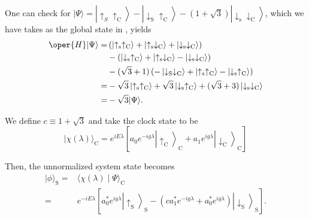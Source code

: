 One can check for $|\Psi\rangle=\left|\uparrow_S \uparrow_{\mathrm{C}}\right\rangle
-\left|\downarrow_{\mathrm{S}} \uparrow_{\mathrm{C}}\right\rangle-(1+\sqrt{3})\left|
\downarrow_{\mathrm{s}} \downarrow_{\mathrm{C}}\right\rangle$, 
which we have takes as the global state in , yields
\begin{equation}
\begin{aligned}
\oper{H}|\Psi\rangle= & \left(\left|\uparrow_{\mathrm{s}} \uparrow_{\mathrm{C}}\right\rangle+\left|\uparrow_{\mathrm{s}} \downarrow_{\mathrm{C}}\right\rangle+\left|\downarrow_{\mathrm{s}} \downarrow_{\mathrm{C}}\right\rangle\right) \\
& -\left(\left|\downarrow_{\mathrm{s}} \uparrow_{\mathrm{C}}\right\rangle+\left|\uparrow_{\mathrm{s}} \downarrow_{\mathrm{C}}\right\rangle-\left|\downarrow_{\mathrm{s}} \downarrow_{\mathrm{C}}\right\rangle\right) \\
& -(\sqrt{3}+1)\left(-\left|\downarrow_{\mathrm{S}} \downarrow_{\mathrm{C}}\right\rangle+\left|\uparrow_{\mathrm{s}} \uparrow_{\mathrm{C}}\right\rangle-\left|\downarrow_{\mathrm{s}} \uparrow_{\mathrm{C}}\right\rangle\right) \\
= & -\sqrt{3}\left|\uparrow_{\mathrm{s}} \uparrow_{\mathrm{C}}\right\rangle+\sqrt{3}\left|\downarrow_{\mathrm{s}} \uparrow_{\mathrm{C}}\right\rangle+(\sqrt{3}+3)\left|\downarrow_{\mathrm{s}} \downarrow_{\mathrm{C}}\right\rangle \\
= & -\sqrt{3}|\Psi\rangle .
\end{aligned}
\end{equation}

We define $c \equiv 1+\sqrt{3}$ and take the clock state to be
\begin{equation}
|\chi(\lambda)\rangle_{\mathrm{C}}=e^{i E \lambda}\left[a_0 e^{-i g \lambda}\left|\uparrow_{\mathrm{C}}\right\rangle_{\mathrm{C}}+a_1 e^{i g \lambda}\left|\downarrow_{\mathrm{C}}\right\rangle_{\mathrm{C}}\right]
\end{equation}

Then, the unnormalized system state becomes
\begin{equation}
\begin{aligned}
|\phi\rangle_{\mathrm{S}}= & \langle\chi(\lambda) \mid \Psi\rangle_{\mathrm{C}} \\
= & e^{-i E \lambda}\left[a_0^* e^{i g \lambda}\left|\uparrow_{\mathrm{S}}\right\rangle_{\mathrm{S}} 
-\left(c a_1^* e^{-i g \lambda}+a_0^* e^{i g \lambda}\right)\left|\downarrow_{\mathrm{S}}\right\rangle_{\mathrm{S}}\right] .
\end{aligned}
\end{equation}

